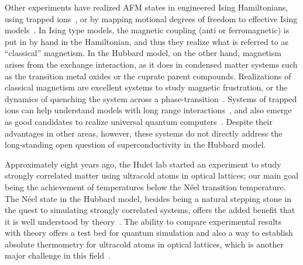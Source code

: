 Other experiments have realized AFM states in engineered Ising Hamiltonians,
using trapped ions~\cite{Kim2010,Britton2012}, or by mapping motional degrees
of freedom to effective Ising models~\cite{Simon2011, Struck19082011}.  In
Ising type models, the magnetic coupling (anti or ferromagnetic) is put in by
hand in the Hamiltonian, and thus they realize what is referred to as
``classical'' magnetism.  In the Hubbard model, on the other hand,  magnetism
arises from the exchange interaction, as it does in condensed matter systems
such as the transition metal oxides or the cuprate parent compounds.
Realizations of classical magnetism are excellent systems to study magnetic
frustration, or the dynamics of quenching the system across a
phase-transition~\cite{PhysRevLett.111.053003}.   Systems of trapped ions can
help understand models with long range interactions~\cite{Richerme2014}, and
also emerge as good candidates to realize universal quantum
computers~\cite{Britton2012}.  Despite their advantages in other areas,
however, these systems do not directly address the long-standing open question
of superconductivity in the Hubbard model.


Approximately eight years ago, the Hulet lab started an experiment to study
strongly correlated matter using ultracold atoms in optical lattices; our main
goal being the achievement of temperatures below the N\'{e}el transition
temperature.  The N\'{e}el state in the Hubbard model,  besides being a
natural stepping stone in the quest to simulating strongly correlated systems,
offers the added benefit that it is well understood by theory~\cite{Paiva2011,
Fuchs2011}.   The ability to compare experimental results with theory offers a
test bed for quantum simulation and also a way to establish absolute
thermometry for ultracold atoms in optical lattices,  which is another major
challenge in this field~\cite{McKay2011}.  



